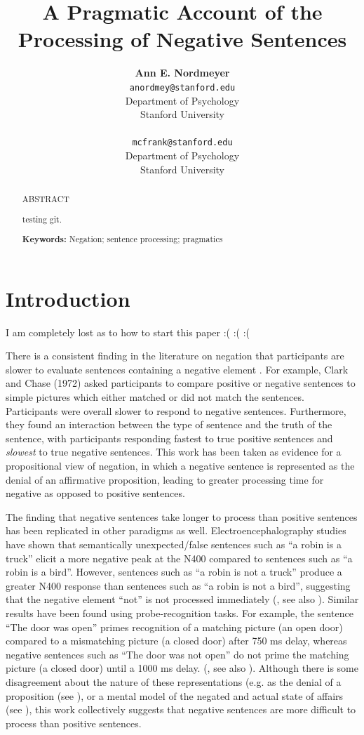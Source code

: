 \documentclass[10pt,letterpaper]{article}
\title{A Pragmatic Account of the Processing of Negative Sentences}
\author{{\large \bf Ann E. Nordmeyer} \\ \texttt{anordmey@stanford.edu}\\ Department of Psychology \\ Stanford University \\ 
\And {\large \bf Michael C. Frank} \\ \texttt{mcfrank@stanford.edu} \\ Department of Psychology \\ Stanford University \\ }
\begin{document}
\maketitle

\begin{abstract}

ABSTRACT

testing git.  

\textbf{Keywords:} 
Negation; sentence processing; pragmatics
\end{abstract}

\section{Introduction}

I am completely lost as to how to start this paper :( :( :(

There is a consistent finding in the literature on negation that participants are slower to evaluate sentences containing a negative element  \cite{hclark1972, carpenter1975, just1971, just1976}.  For example, Clark and Chase (1972) asked participants to compare positive or negative sentences to simple pictures which either matched or did not match the sentences.  Participants were overall slower to respond to negative sentences.  Furthermore, they found an interaction between the type of sentence and the truth of the sentence, with participants responding fastest to true positive sentences and \emph{slowest} to true negative sentences.  This work has been taken as evidence for a propositional view of negation, in which a negative sentence is represented as the denial of an affirmative proposition, leading to greater processing time for negative as opposed to positive sentences. 

The finding that negative sentences take longer to process than positive sentences has been replicated in other paradigms as well.  Electroencephalography studies have shown that semantically unexpected/false sentences such as ``a robin is a truck'' elicit a more negative peak at the N400 compared to sentences such as ``a robin is a bird''.  However, sentences such as ``a robin is not a truck'' produce a greater N400 response than sentences such as ``a robin is not a bird'', suggesting that the negative element ``not'' is not processed immediately (, see also ).  Similar results have been found using probe-recognition tasks.  For example, the sentence ``The door was open'' primes recognition of  a matching picture (an open door) compared to a mismatching picture (a closed door) after 750 ms delay, whereas negative sentences such as ``The door was not open'' do not prime the matching picture (a closed door) until a 1000 ms delay.  (, see also ).  Although there is some disagreement about the nature of these representations (e.g. as the denial of a proposition (see ), or a mental model of the negated and actual state of affairs (see ), this work collectively suggests that negative sentences are more difficult to process than positive sentences.  
  
\end{document}
